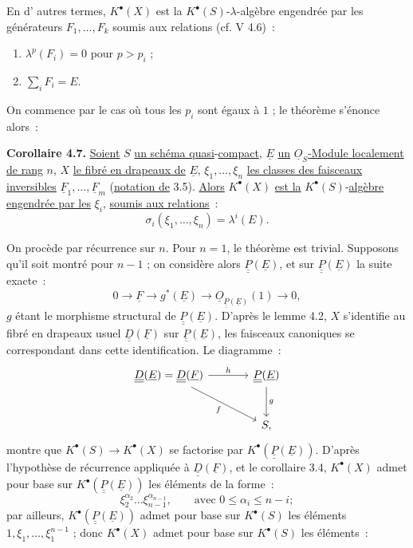 
En d'%
autres termes, \(K^{\bullet}(X)\) est la \(K^{\bullet}(S)\)-\(\lambda\)-algèbre engendrée par les générateurs \(F_1,\ldots,F_k\) soumis aux relations (cf. V 4.6)~:
\begin{enumerate}[label=\textup{\roman*)}]
\item \(\lambda^p(F_i)=0\) pour \(p>p_i\) ;
\item \(\sum_i F_i=E\).
\end{enumerate}

On commence par le cas où tous les \(p_i\) sont égaux à \(1\) ; le théorème s'énonce alors~:

\textbf{Corollaire 4.7.} \uline{Soient} \(S\) \uline{un schéma quasi}-\uline{compact}, \(\underline{E}\) \uline{un} \(\underline{O}_S\)\uline{-Module localement de rang} \(n\), \(X\) \uline{le fibré en drapeaux de} \(\underline{E}\), \(\xi_1,\ldots,\xi_n\) \uline{les classes des faisceaux inversibles} \(\underline{F}_1,\ldots,\underline{F}_m\) (\uline{notation de} 3.5). \uline{Alors} \(K^{\bullet}(X)\) \uline{est la} \(K^{\bullet}(S)\)-\uline{algèbre engendrée par les} \(\xi_i\), \uline{soumis aux relations}~:
\[
  \sigma_i(\xi_1,\ldots,\xi_n)=\lambda^i(E).
\]

On procède par récurrence sur \(n\). Pour \(n=1\), le théorème est trivial. Supposons qu'il soit montré pour \(n-1\) ; on considère alors \(\underline{\underline{P}}(\underline{E})\), et sur \(\underline{\underline{P}}(\underline{E})\) la suite exacte~:
\[
  0\longrightarrow \underline{F}\longrightarrow g^*(\underline{E})\longrightarrow \underline{O}_{\underline{\underline{P}}(\underline{E})}(1)\longrightarrow 0,
\]
\(g\) étant le morphisme structural de \(\underline{\underline{P}}(\underline{E})\). D'après le lemme 4.2, \(X\) s'identifie au fibré en drapeaux usuel \(\underline{\underline{D}}(\underline{F})\) sur \(\underline{\underline{P}}(\underline{E})\), les faisceaux canoniques se correspondant dans cette identification. Le diagramme~:
\[
\begin{tikzcd}[column sep=large,row sep=large]
\underline{\underline{D}}(\underline{E})=\underline{\underline{D}}(\underline{F}) \arrow[r,"h"] \arrow[dr,"f"'] & \underline{\underline{P}}(\underline{E}) \arrow[d,"g"]\\
& S,
\end{tikzcd}
\]
montre que \(K^{\bullet}(S)\to K^{\bullet}(X)\) se factorise par \(K^{\bullet}(\underline{\underline{P}}(\underline{E}))\). D'après l'hypothèse de récurrence appliquée à \(\underline{\underline{D}}(\underline{F})\), et le corollaire 3.4, \(K^{\bullet}(X)\) admet pour base sur \(K^{\bullet}(\underline{\underline{P}}(\underline{E}))\) les éléments de la forme~:
\[
  \xi_2^{\alpha_2}\ldots\xi_{n-1}^{\alpha_{n-1}},
  \qquad \text{avec } 0\le\alpha_i\le n-i;
\]
par ailleurs, \(K^{\bullet}(\underline{\underline{P}}(\underline{E}))\) admet pour base sur \(K^{\bullet}(S)\) les éléments \(1,\xi_1,\ldots,\xi_1^{n-1}\) ; donc \(K^{\bullet}(X)\) admet pour base sur \(K^{\bullet}(S)\) les éléments~:
